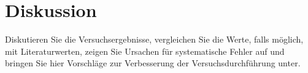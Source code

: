 \section{Diskussion}

Diskutieren Sie die Versuchsergebnisse, vergleichen Sie die Werte, falls möglich, mit
Literaturwerten, zeigen Sie Ursachen für systematische Fehler auf und bringen Sie
hier Vorschläge zur Verbesserung der Versuchsdurchführung unter.